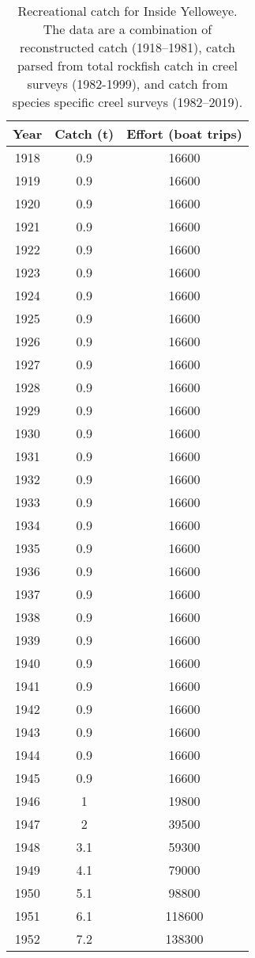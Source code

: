 \documentclass[11pt]{book}
\begin{document}
\begin{longtable}[t]{ccc}
\caption{\label{tab:rectable}Recreational catch for Inside Yelloweye. The data are a combination of reconstructed catch (1918--1981), catch parsed from total rockfish catch in creel surveys (1982-1999), and catch from species specific creel surveys (1982--2019).}\\
\toprule
\textbf{Year} & \textbf{Catch (t)} & \textbf{Effort (boat trips)}\\
\midrule
1918 & 0.9 & 16600\\
1919 & 0.9 & 16600\\
1920 & 0.9 & 16600\\
1921 & 0.9 & 16600\\
1922 & 0.9 & 16600\\
1923 & 0.9 & 16600\\
1924 & 0.9 & 16600\\
1925 & 0.9 & 16600\\
1926 & 0.9 & 16600\\
1927 & 0.9 & 16600\\
1928 & 0.9 & 16600\\
1929 & 0.9 & 16600\\
1930 & 0.9 & 16600\\
1931 & 0.9 & 16600\\
1932 & 0.9 & 16600\\
1933 & 0.9 & 16600\\
1934 & 0.9 & 16600\\
1935 & 0.9 & 16600\\
1936 & 0.9 & 16600\\
1937 & 0.9 & 16600\\
1938 & 0.9 & 16600\\
1939 & 0.9 & 16600\\
1940 & 0.9 & 16600\\
1941 & 0.9 & 16600\\
1942 & 0.9 & 16600\\
1943 & 0.9 & 16600\\
1944 & 0.9 & 16600\\
1945 & 0.9 & 16600\\
1946 & 1 & 19800\\
1947 & 2 & 39500\\
1948 & 3.1 & 59300\\
1949 & 4.1 & 79000\\
1950 & 5.1 & 98800\\
1951 & 6.1 & 118600\\
1952 & 7.2 & 138300\\

\end{longtable}
\end{document}
